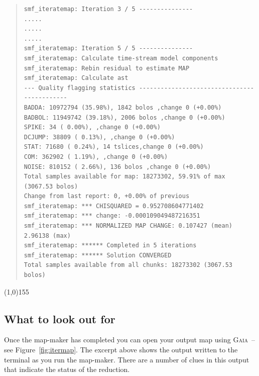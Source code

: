 \documentclass[twoside,11pt]{article}
\newcommand{\htmlref}[2]{#1}
\newcommand{\latex}[1]{#1}
\newcommand{\latexhtml}[2]{#1}
\newcommand{\xref}[3]{#1}
\newcommand{\xlabel}[1]{}
\renewcommand{\_}{\texttt{\symbol{95}}}
\newenvironment{myquote}{\begin{quote}\begin{small}}{\end{small}\end{quote}}
\newcommand{\gaia}{\xref{\textsc{Gaia}}{sun214}{}}
\newcommand{\cref}[3]{\latexhtml{#1~\ref{#2}}{\htmlref{#3}{#2}}}
\begin{document}
\begin{myquote}
\begin{verbatim}
smf_iteratemap: Iteration 3 / 5 ---------------
.....
.....
.....
smf_iteratemap: Iteration 5 / 5 ---------------
smf_iteratemap: Calculate time-stream model components
smf_iteratemap: Rebin residual to estimate MAP
smf_iteratemap: Calculate ast
--- Quality flagging statistics --------------------------------------------
BADDA: 10972794 (35.98%), 1842 bolos ,change 0 (+0.00%)
BADBOL: 11949742 (39.18%), 2006 bolos ,change 0 (+0.00%)
SPIKE: 34 ( 0.00%), ,change 0 (+0.00%)
DCJUMP: 38809 ( 0.13%), ,change 0 (+0.00%)
STAT: 71680 ( 0.24%), 14 tslices,change 0 (+0.00%)
COM: 362902 ( 1.19%), ,change 0 (+0.00%)
NOISE: 810152 ( 2.66%), 136 bolos ,change 0 (+0.00%)
Total samples available for map: 18273302, 59.91% of max (3067.53 bolos)
Change from last report: 0, +0.00% of previous
smf_iteratemap: *** CHISQUARED = 0.952708604771402
smf_iteratemap: *** change: -0.000109049487216351
smf_iteratemap: *** NORMALIZED MAP CHANGE: 0.107427 (mean) 2.96138 (max)
smf_iteratemap: ****** Completed in 5 iterations
smf_iteratemap: ****** Solution CONVERGED
Total samples available from all chunks: 18273302 (3067.53 bolos)
\end{verbatim}
\end{myquote}
\vspace{-10mm}
\begin{center}
\latex{\line(1,0){155}}
\end{center}

\subsection{\xlabel{look_for}What to look out for}

Once the map-maker has completed you can open your output map using
\gaia\ -- see \cref{Figure}{fig:itermap}{the figure below}. The excerpt
above shows the output written to the terminal as you run the map-maker. There
are a number of clues in this output that indicate the status of the
reduction.
\end{document}
